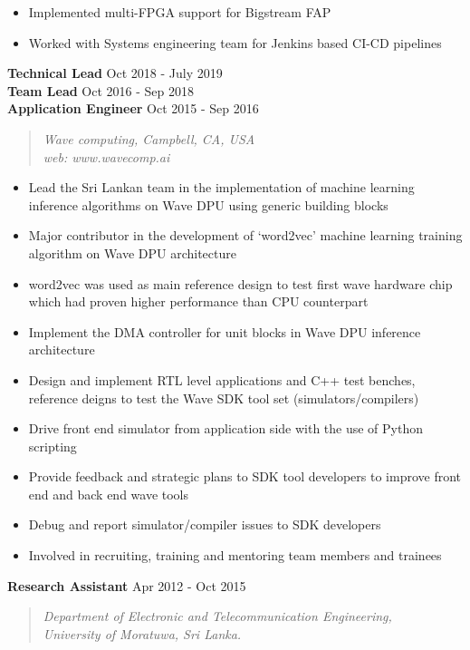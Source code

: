 \documentclass[mm]{res} %
\begin{document}
\begin{resume}
\begin{itemize}
	\item Implemented multi-FPGA support for Bigstream FAP
	\item Worked with Systems engineering team for Jenkins based CI-CD pipelines
\end{itemize}
\textbf{Technical Lead} \hfill Oct 2018 - July 2019\\
\textbf{Team Lead} \hfill Oct 2016 - Sep 2018\\
\textbf{Application Engineer} \hfill Oct 2015 - Sep 2016
\begin{quote}
	\emph{Wave computing, Campbell, CA, USA\\
		  web: www.wavecomp.ai}
\end{quote}
\begin{itemize} \itemsep -1pt 
	\item Lead the Sri Lankan team in the implementation of machine learning inference algorithms on Wave DPU using generic building blocks
	\item Major contributor in the development of `word2vec' machine learning training algorithm on Wave DPU architecture
	\item word2vec was used as main reference design to test first wave hardware chip which had proven higher performance than CPU counterpart
	\item Implement the DMA controller for unit blocks in Wave DPU inference architecture
	\item Design and implement RTL level applications and C++ test benches, reference deigns to test the Wave SDK tool set (simulators/compilers)
	\item Drive front end simulator from application side with the use of Python scripting
	\item Provide feedback and strategic plans to SDK tool developers to improve front end and back end wave tools
	\item Debug and report simulator/compiler issues to SDK developers
	\item Involved in recruiting, training and mentoring team members and trainees
\end{itemize}

\textbf{Research Assistant} \hfill Apr 2012 - Oct 2015
\begin{quote}
	\emph{Department of Electronic and Telecommunication Engineering, \\
		University of Moratuwa, Sri Lanka.}
\end{quote}


\end{resume}
\end{document}
